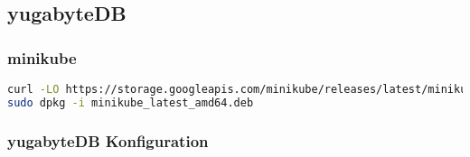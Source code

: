 
\subsection{yugabyteDB}
\subsubsection{minikube}
\lstset{style=gra_codestyle}
\begin{lstlisting}[language=bash, caption=minikube installieren,captionpos=b,label={lst:opensuse-network-setting},breaklines=true]
curl -LO https://storage.googleapis.com/minikube/releases/latest/minikube_latest_amd64.deb
sudo dpkg -i minikube_latest_amd64.deb
\end{lstlisting}
\subsubsection{yugabyteDB Konfiguration}